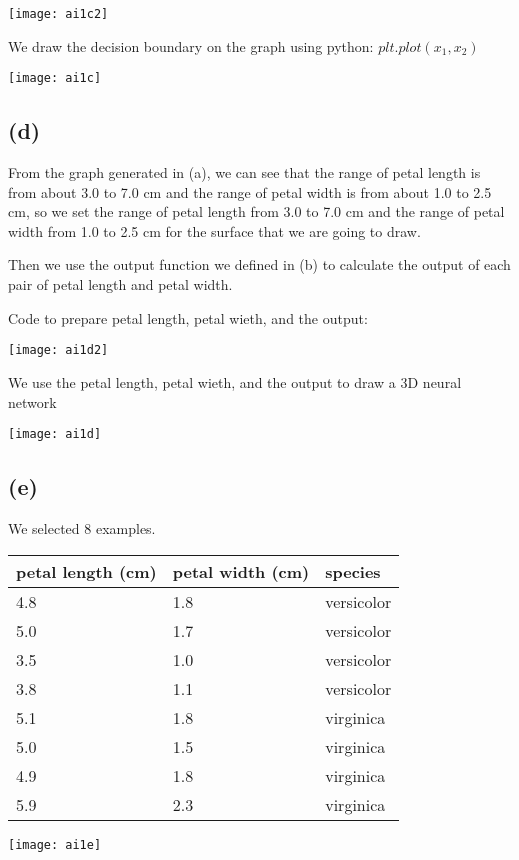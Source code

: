 \documentclass[11pt]{article}
\begin{document}
\texttt{[image: ai1c2]}

We draw the decision boundary on the graph using python: $plt.plot(x_1, x_2)$

\texttt{[image: ai1c]}

\subsection*{(d)}

From the graph generated in (a), we can see that the range of petal length is from about 3.0 to 7.0 cm and the range of petal width is from about 1.0 to 2.5 cm,
so we set the range of petal length from 3.0 to 7.0 cm and the range of petal width from 1.0 to 2.5 cm for the surface that we are going to draw.

Then we use the output function we defined in (b) to calculate the output of each pair of petal length and petal width.

Code to prepare petal length, petal wieth, and the output:

\texttt{[image: ai1d2]}

We use the petal length, petal wieth, and the output to draw a 3D neural network

\texttt{[image: ai1d]}

\subsection*{(e)}

We selected 8 examples. 

\begin{tabular}{|l l l|}
    \hline
    petal length (cm) & petal width (cm) & species\\
    \hline
    4.8 & 1.8 & versicolor\\
    5.0 & 1.7 & versicolor\\
    3.5 & 1.0 & versicolor\\
    3.8 & 1.1 & versicolor\\
    5.1 & 1.8 & virginica \\
    5.0 & 1.5 & virginica \\
    4.9 & 1.8 & virginica \\
    5.9 & 2.3 & virginica \\
    \hline
\end{tabular}

\texttt{[image: ai1e]}
\end{document}
